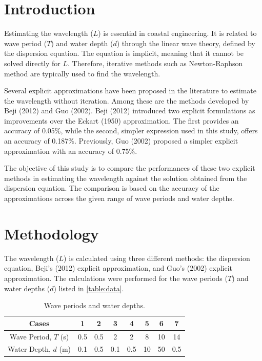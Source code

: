 \documentclass[a4paper, 11pt]{article}
\begin{document}
\listoffigures
\listoftables
\newpage

\section{Introduction}

\hspace*{0.5cm}Estimating the wavelength ($L$) is  essential in coastal engineering. It is related to wave period ($T$) and water depth ($d$) through the linear wave theory, defined by the dispersion equation. The equation is implicit, meaning that it cannot be solved directly for $L$. Therefore, iterative methods such as Newton-Raphson method are typically used to find the wavelength. 

Several explicit approximations have been proposed in the literature to estimate the wavelength without iteration. Among these are the methods developed by Beji (2012) and Guo (2002). Beji (2012) introduced two explicit formulations as improvements over the Eckart (1950) approximation. The first provides an accuracy of 0.05\%, while the second, simpler expression used in this study, offers an accuracy of 0.187\%. Previously, Guo (2002) proposed a simpler explicit approximation with an accuracy of 0.75\%. 

The objective of this study is to compare the performances of these two explicit methods in estimating the wavelength against the solution obtained from the dispersion equation. The comparison is based on the accuracy of the approximations across the given range of wave periods and water depths.

\section{Methodology}

\hspace*{0.5cm}The wavelength ($L$) is calculated using three different methods: the dispersion equation, Beji's (2012) explicit approximation, and Guo's (2002) explicit approximation. The calculations were performed for the wave periods ($T$) and water depths ($d$) listed in \autoref{table:data}. 

\begin{table}[H]
    \centering
    \caption{Wave periods and water depths.}
    \begin{tabular}{|c|c|c|c|c|c|c|c|}
        \hline
        \textbf{Cases} & \textbf{1} & \textbf{2} & \textbf{3} & \textbf{4} & \textbf{5} & \textbf{6} & \textbf{7} \\
        \hline
        Wave Period, $T$ (s) & 0.5 & 0.5 & 2 & 2 & 8 & 10 & 14 \\
        \hline
        Water Depth, $d$ (m) & 0.1 & 0.5 & 0.1 & 0.5 & 10 & 50 & 0.5 \\
        \hline
    \end{tabular}
    \label{table:data}
\end{table}
\end{document}
